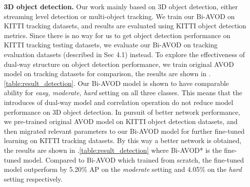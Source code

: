 \documentclass{bmvc2k}
\begin{document}
\textbf{3D object detection.} Our work mainly based on 3D object detection, either streaming level detection or multi-object tracking. We train our Bi-AVOD on KITTI tracking datasets, and results are evaluated using KITTI object detection metrics. Since there is no way for us to get object detection performance on KITTI tracking testing datasets, we evaluate our Bi-AVOD on tracking evaluation datasets (described in Sec 4.1) instead. To explore the effectiveness of dual-way structure on object detection performance, we train original AVOD model on tracking datasets for comparison, the results are shown in \tablename .\ref{table:result_detection}. Our Bi-AVOD model is shown to have comparable ability for \textit{easy, moderate, hard} setting on all three classes. This means that the introduces of dual-way model and correlation operation do not reduce model performance on 3D object detection. In pursuit of better network performance, we pre-trained original AVOD model on KITTI object detection datasets, and then migrated relevant parameters to our Bi-AVOD model for further fine-tuned learning on KITTI tracking datasets. By this way a better network is obtained, the results are shown in \tablename .\ref{table:result_detection} where Bi-AVOD* is the fine-tuned model. Compared to Bi-AVOD which trained from scratch, the fine-tuned model outperform by 5.20\% AP on the \textit{moderate} setting and 4.05\% on the \textit{hard} setting respectively.   
\end{document}
